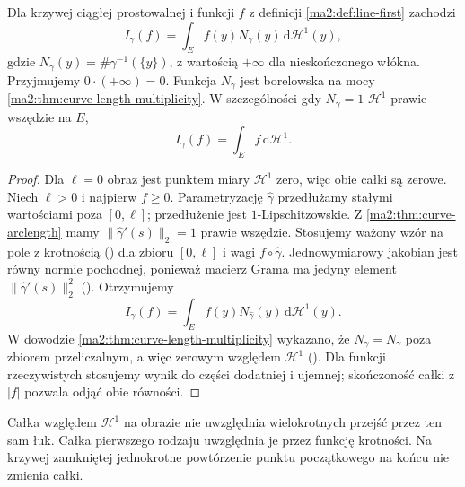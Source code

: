 \begin{twierdzenie}
\label{ma2:thm:line-weighted-area}
Dla krzywej ciągłej prostowalnej i funkcji
$f$ z definicji \ref{ma2:def:line-first} zachodzi
\[
 I_\gamma(f)=\int_E f(y)N_\gamma(y)\,
 \mathrm d\mathcal H^1(y),
\]
gdzie $N_\gamma(y)=\#\gamma^{-1}(\{y\})$,
z wartością $+\infty$ dla nieskończonego włókna.
Przyjmujemy $0\cdot(+\infty)=0$.
Funkcja $N_\gamma$ jest borelowska na mocy
\ref{ma2:thm:curve-length-multiplicity}.
W szczególności gdy $N_\gamma=1$
$\mathcal H^1$-prawie wszędzie na $E$,
\[
 I_\gamma(f)=\int_E f\,\mathrm d\mathcal H^1.
\]
\end{twierdzenie}
\begin{proof}
Dla $\ell=0$ obraz jest punktem miary $\mathcal H^1$
zero,
więc obie całki są zerowe.
Niech $\ell>0$ i najpierw $f\ge0$.
Parametryzację $\widehat\gamma$ przedłużamy
stałymi wartościami poza $[0,\ell]$;
przedłużenie jest $1$-Lipschitzowskie.
Z \ref{ma2:thm:curve-arclength} mamy
$\|\widehat\gamma'(s)\|_2=1$ prawie wszędzie.
Stosujemy ważony wzór na pole z krotnością
()
dla zbioru $[0,\ell]$ i wagi
$f\circ\widehat\gamma$. Jednowymiarowy
jakobian jest równy normie pochodnej, ponieważ
macierz Grama ma jedyny element
$\|\widehat\gamma'(s)\|_2^2$
().
Otrzymujemy
\[
 I_\gamma(f)=\int_E f(y)N_{\widehat\gamma}(y)\,
 \mathrm d\mathcal H^1(y).
\]
W dowodzie \ref{ma2:thm:curve-length-multiplicity}
wykazano, że $N_{\widehat\gamma}=N_\gamma$
poza zbiorem przeliczalnym, a więc zerowym
względem $\mathcal H^1$
().
Dla funkcji rzeczywistych stosujemy wynik
do części dodatniej i ujemnej; skończoność
całki z $|f|$ pozwala odjąć obie równości.
\end{proof}

Całka względem $\mathcal H^1$ na obrazie
nie uwzględnia wielokrotnych przejść przez
ten sam łuk. Całka pierwszego rodzaju
uwzględnia je przez funkcję krotności.
Na krzywej zamkniętej jednokrotne powtórzenie
punktu początkowego na końcu nie zmienia całki.

